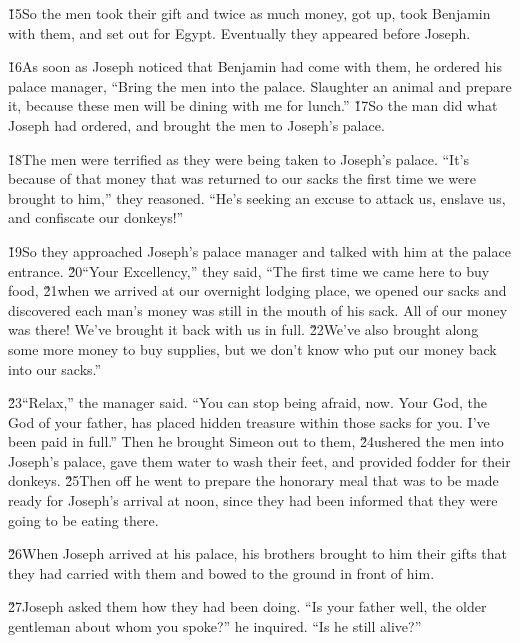 \v{15}So the men took their gift and twice as much money, got up, took Benjamin with them, and set out for Egypt. Eventually they appeared before Joseph.

\v{16}As soon as Joseph noticed that Benjamin had come with them, he ordered his palace manager, ``Bring the men into the palace. Slaughter an animal and prepare it, because these men will be dining with me for lunch.'' \v{17}So the man did what Joseph had ordered, and brought the men to Joseph's palace.

\v{18}The men were terrified as they were being taken to Joseph's palace. ``It's because of that money that was returned to our sacks the first time we were brought to him,'' they reasoned. ``He's seeking an excuse to attack us, enslave us, and confiscate our donkeys!''

\v{19}So they approached Joseph's palace manager and talked with him at the palace entrance. \v{20}``Your Excellency,'' they said, ``The first time we came here to buy food, \v{21}when we arrived at our overnight lodging place, we opened our sacks and discovered each man's money was still in the mouth of his sack. All of our money was there! We've brought it back with us in full. \v{22}We've also brought along some more money to buy supplies, but we don't know who put our money back into our sacks.''

\v{23}``Relax,'' the manager said. ``You can stop being afraid, now. Your God, the God of your father, has placed hidden treasure within those sacks for you. I've been paid in full.'' Then he brought Simeon out to them, \v{24}ushered the men into Joseph's palace, gave them water to wash their feet, and provided fodder for their donkeys. \v{25}Then off he went to prepare the honorary meal that was to be made ready for Joseph's arrival at noon, since they had been informed that they were going to be eating there.

\v{26}When Joseph arrived at his palace, his brothers brought to him their gifts that they had carried with them and bowed to the ground in front of him.

\v{27}Joseph asked them how they had been doing. ``Is your father well, the older gentleman about whom you spoke?'' he inquired. ``Is he still alive?''

